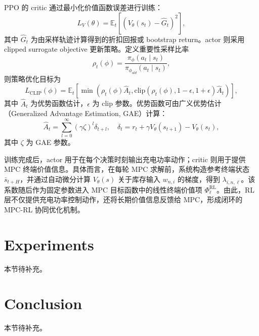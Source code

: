 \documentclass[12pt,hyperref,a4paper,UTF8]{ctexart}
\begin{document}
PPO 的 critic 通过最小化价值函数误差进行训练：
\begin{equation}
L_V(\theta)=
\mathbb{E}_t\left[
\left(V_{\theta}(s_t)-\hat{G}_t\right)^2
\right],
\label{eq:value_loss}
\end{equation}
其中 $\hat{G}_t$ 为由采样轨迹计算得到的折扣回报或 bootstrap return。actor 则采用 clipped surrogate objective 更新策略。定义重要性采样比率
\begin{equation}
\rho_t(\phi)=
\frac{\pi_{\phi}(a_t\mid s_t)}{\pi_{\phi_{old}}(a_t\mid s_t)},
\label{eq:ppo_ratio}
\end{equation}
则策略优化目标为
\begin{equation}
L_{\mathrm{CLIP}}(\phi)=
\mathbb{E}_t\left[
\min\left(
\rho_t(\phi)\hat{A}_t,
\mathrm{clip}(\rho_t(\phi),1-\epsilon,1+\epsilon)\hat{A}_t
\right)
\right],
\label{eq:ppo_clip}
\end{equation}
其中 $\hat{A}_t$ 为优势函数估计，$\epsilon$ 为 clip 参数。优势函数可由广义优势估计（Generalized Advantage Estimation, GAE）计算：
\begin{equation}
\hat{A}_t=\sum_{l=0}^{\infty}(\gamma\zeta)^l\delta_{t+l},
\quad
\delta_t=r_t+\gamma V_{\theta}(s_{t+1})-V_{\theta}(s_t),
\label{eq:gae}
\end{equation}
其中 $\zeta$ 为 GAE 参数。

训练完成后，actor 用于在每个决策时刻输出充电功率动作；critic 则用于提供 MPC 终端价值信息。具体而言，在每轮 MPC 求解前，系统构造参考终端状态 $\bar{s}_{t+H}$，并通过自动微分计算 $V_{\theta}(s)$ 关于库存输入 $w_{n,i}$ 的梯度，得到 $\lambda_{i,n,\ell}$。该系数随后作为固定参数进入 MPC 目标函数中的线性终端价值项 $\Phi_{\ell}^{\mathrm{RL}}$。由此，RL 层不仅提供充电功率控制动作，还将长期价值信息反馈给 MPC，形成闭环的 MPC-RL 协同优化机制。

\section{Experiments}

本节待补充。

\section{Conclusion}

本节待补充。


\end{document}
